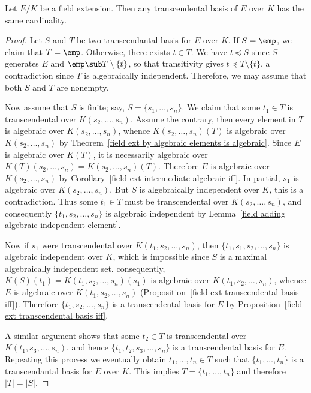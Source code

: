 \begin{theorem}\label{field ext transcendental invariance degree}
Let $E/K$ be a field extension. Then any transcendental basis of $E$ over $K$ has the same cardinality.
\end{theorem}
\begin{proof}
Let $S$ and $T$ be two transcendantal basis for $E$ over $K$. If $S=\emp$, we claim that $T=\emp$. Otherwise, there exists $t\in T$. We have $t\preceq S$ since $S$ generates $E$ and $\emp\sub T\setminus\{t\}$, so that transitivity gives $t\preceq T\setminus\{t\}$, a contradiction since $T$ is algebraically independent. Therefore, we may assume that both $S$ and $T$ are nonempty.\par
Now assume that $S$ is finite; say, $S=\{s_1,\dots,s_n\}$. We claim that some $t_1\in T$ is transcendental over $K(s_2,\dots,s_n)$. Assume the contrary, then every element in $T$ is algebraic over $K(s_2,\dots,s_n)$, whence $K(s_2,\dots,s_n)(T)$ is algebraic over $K(s_2,\dots,s_n)$ by Theorem~\ref{field ext by algebraic elements is algebraic}. Since $E$ is algebraic over $K(T)$, it is necessarily algebraic over $K(T)(s_2,\dots,s_n)=K(s_2,\dots,s_n)(T)$. Therefore $E$ is algebraic over $K(s_2,\dots,s_n)$ by Corollary~\ref{field ext intermediate algebraic iff}. In partial, $s_1$ is algebraic over $K(s_2,\dots,s_n)$. But $S$ is algebraically independent over $K$, this is a contradiction. Thus some $t_1\in T$ must be transcendental over $K(s_2,\dots,s_n)$, and consequently $\{t_1,s_2,\dots,s_n\}$ is algebraic independent by Lemma~\ref{field adding algebraic independent element}.\par
Now if $s_1$ were transcendental over $K(t_1,s_2,\dots,s_n)$, then $\{t_1,s_1,s_2,\dots,s_n\}$ is algebraic independent over $K$, which is impossible since $S$ is a maximal algebraically independent set. consequently, $K(S)(t_1)=K(t_1,s_2,\dots,s_n)(s_1)$ is algebraic over $K(t_1,s_2,\dots,s_n)$, whence $E$ is algebraic over $K(t_1,s_2,\dots,s_n)$ (Proposition~\ref{field ext transcendental basis iff}). Therefore $\{t_1,s_2,\dots,s_n\}$ is a transcendental basis for $E$ by Proposition~\ref{field ext transcendental basis iff}.\par
A similar argument shows that some $t_2\in T$ is transcendental over $K(t_1,s_3,\dots,s_n)$, and hence $\{t_1,t_2,s_3,\dots,s_n\}$ is a transcendental basis for $E$. Repeating this process we eventually obtain $t_1,\dots,t_n\in T$ such that $\{t_1,\dots,t_n\}$ is a transcendantal basis for $E$ over $K$. This implies $T=\{t_1,\dots,t_n\}$ and therefore $|T|=|S|$.\par

\end{proof}

